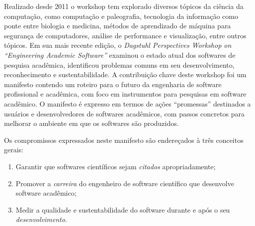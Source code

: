 Realizado desde 2011 o workshop tem explorado diversos tópicos da ciência da
computação, como computação e paleografia, tecnologia da informação como ponte
entre biologia e medicina, métodos de aprendizado de máquina para segurança de
computadores, análise de performance e visualização, entre outros tópicos. Em
sua mais recente edição, o {\it Dagstuhl Perspectives Workshop on ``Engineering
Academic Software''} \cite{allen2017engineering} examinou o estado atual dos
softwares de pesquisa acadêmica, identificou problemas comuns em seu
desenvolvimento, reconhecimento e sustentabilidade. A contribuição chave deste
workshop foi um manifesto contendo um roteiro para o futuro da engenharia de
software profissional e acadêmica, com foco em instrumentos para pesquisas em
software acadêmico. O manifesto é expresso em termos de ações ``promessas''
destinados a usuários e desenvolvedores de softwares acadêmicos, com passos
concretos para melhorar o ambiente em que os softwares são produzidos.

Os compromissos expressados neste manifesto são endereçados à três conceitos gerais:

\begin{enumerate}[label=(\roman*)]
  \item Garantir que softwares científicos sejam {\it citados} apropriadamente;
  \item Promover a {\it carreira} do engenheiro de software científico que desenvolve
        software acadêmico;
  \item Medir a qualidade e sustentabilidade do software durante e após o seu
        {\it desenvolvimento}.
\end{enumerate}



